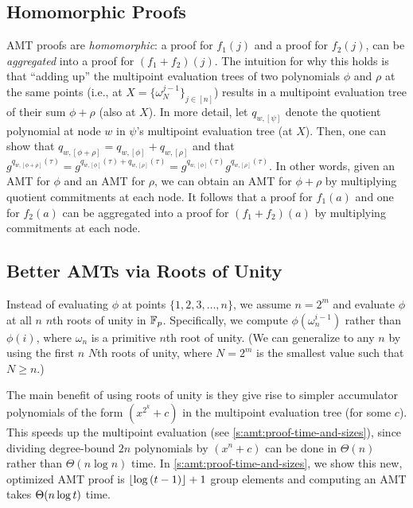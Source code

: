 \subsection{Homomorphic Proofs}
\label{s:amt:homomorphic}
\label{s:scalable-dkg:homomorphic-amt}
AMT proofs are \textit{homomorphic}: a proof for $f_1(j)$ and a proof for $f_2(j)$, can be \textit{aggregated} into a proof for $(f_1+f_2)(j)$.
The intuition for why this holds is that ``adding up'' the multipoint evaluation trees of two polynomials $\phi$ and $\rho$ at the same points (i.e., at $X=\{\omega_N^{j-1}\}_{j\in[n]}$) results in a multipoint evaluation tree of their sum $\phi+\rho$ (also at $X$).
In more detail, let $q_{w, [\psi]}$ denote the quotient polynomial at node $w$ in $\psi$'s multipoint evaluation tree (at $X$).
Then, one can show that $q_{w,[\phi+\rho]} = q_{w,[\phi]} + q_{w,[\rho]}$ and that $g^{q_{w,[\phi+\rho]}(\tau)} = g^{q_{w,[\phi]}(\tau) + q_{w,[\rho]}(\tau)} = g^{q_{w,[\phi]}(\tau)} g^{q_{w,[\rho]}(\tau)}$.
In other words, given an AMT for $\phi$ and an AMT for $\rho$, we can obtain an AMT for $\phi+\rho$ by multiplying quotient commitments at each node.
It follows that a proof for $f_1(a)$ and one for $f_2(a)$ can be aggregated into a proof for $(f_1+f_2)(a)$ by multiplying commitments at each node.

\subsection{Better AMTs via Roots of Unity}
\label{s:amt:roots-of-unity}
Instead of evaluating $\phi$ at points $\{1,2,3,\dots,n\}$, we assume $n=2^m$ and evaluate $\phi$ at all $n$ $n$th roots of unity in $\mathbb{F}_p$.
Specifically, we compute $\phi(\omega_n^{i-1})$ rather than $\phi(i)$, where $\omega_n$ is a primitive $n$th root of unity.
(We can generalize to any $n$ by using the first $n$ $N$th roots of unity, where $N=2^m$ is the smallest value such that $N\ge n$.)

The main benefit of using roots of unity is they give rise to simpler accumulator polynomials of the form $(x^{2^k} + c)$ in the multipoint evaluation tree (for some $c$).
This speeds up the multipoint evaluation (see \cref{s:amt:proof-time-and-sizes}), since dividing degree-bound $2n$ polynomials by $(x^n + c)$ can be done in $\Theta(n)$ rather than $\Theta(n\log{n})$ time.
In \cref{s:amt:proof-time-and-sizes}, we show this new, optimized AMT proof is $\lfloor\log{(t-1)}\rfloor + 1$ group elements and computing an AMT takes $\Theta(n\log{t})$ time.

